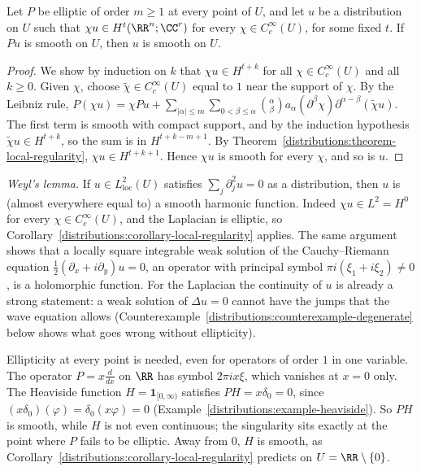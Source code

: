\begin{corollary}\label{distributions:corollary-local-regularity}
Let $P$ be elliptic of order $m \geq 1$ at every point of $U$, and let $u$ be a distribution on $U$ such that $\chi u \in H^t(\RR^n; \CC^r)$ for every $\chi \in C_c^\infty(U)$, for some fixed $t$. If $Pu$ is smooth on $U$,
then $u$ is smooth on $U$.
\end{corollary}

\begin{proof}
We show by induction on $k$ that $\chi u \in H^{t+k}$ for all $\chi \in C_c^\infty(U)$ and all $k \geq 0$. Given $\chi$, choose $\tilde\chi \in C_c^\infty(U)$ equal to $1$ near the support of $\chi$. By the Leibniz rule,
$P(\chi u) = \chi Pu + \sum_{|\alpha| \leq m}\sum_{0 < \beta \leq \alpha}\binom{\alpha}{\beta}a_\alpha(\partial^\beta\chi)\partial^{\alpha - \beta}(\tilde\chi u)$. The first term is smooth with compact support, and by the induction hypothesis
$\tilde\chi u \in H^{t+k}$, so the sum is in $H^{t+k-m+1}$. By Theorem~\ref{distributions:theorem-local-regularity}, $\chi u \in H^{t+k+1}$. Hence $\chi u$ is smooth for every $\chi$, and so is $u$.
\end{proof}

\begin{example}\label{distributions:example-weyl-lemma}
\emph{Weyl's lemma.} If $u \in L^2_{\mathrm{loc}}(U)$ satisfies $\sum_j\partial_j^2u = 0$ as a distribution, then $u$ is (almost everywhere equal to) a smooth harmonic function. Indeed $\chi u \in L^2 = H^0$ for every
$\chi \in C_c^\infty(U)$, and the Laplacian is elliptic, so Corollary~\ref{distributions:corollary-local-regularity} applies. The same argument shows that a locally square integrable weak solution of the Cauchy--Riemann
equation $\frac12(\partial_x + i\partial_y)u = 0$, an operator with principal symbol $\pi i(\xi_1 + i\xi_2) \neq 0$, is a holomorphic function. For the Laplacian the continuity of $u$ is already a strong
statement: a weak solution of $\Delta u = 0$ cannot have the jumps that the wave equation allows (Counterexample~\ref{distributions:counterexample-degenerate} below shows what goes wrong without ellipticity).
\end{example}

\begin{counterexample}\label{distributions:counterexample-degenerate}
Ellipticity at every point is needed, even for operators of order $1$ in one variable. The operator $P = x\frac{d}{dx}$ on $\RR$ has symbol $2\pi ix\xi$, which vanishes at $x = 0$ only. The Heaviside function
$H = \mathbf{1}_{[0, \infty)}$ satisfies $PH = x\delta_0 = 0$, since $(x\delta_0)(\varphi) = \delta_0(x\varphi) = 0$ (Example~\ref{distributions:example-heaviside}). So $PH$ is smooth, while $H$ is not even continuous; the
singularity sits exactly at the point where $P$ fails to be elliptic. Away from $0$, $H$ is smooth, as Corollary~\ref{distributions:corollary-local-regularity} predicts on $U = \RR \setminus \{0\}$.
\end{counterexample}

